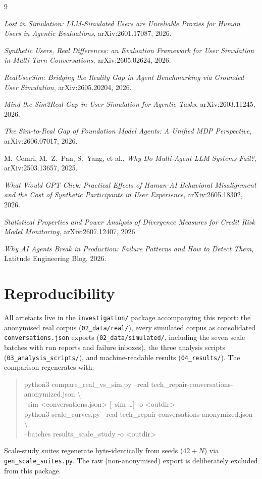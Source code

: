 \documentclass[11pt,a4paper]{article}
\begin{document}
\begin{thebibliography}{9}\small

 \emph{Lost in Simulation: LLM-Simulated Users are Unreliable Proxies for Human
Users in Agentic Evaluations}, arXiv:2601.17087, 2026.

 \emph{Synthetic Users, Real Differences: an Evaluation Framework for User
Simulation in Multi-Turn Conversations}, arXiv:2605.02624, 2026.

 \emph{RealUserSim: Bridging the Reality Gap in Agent Benchmarking via
Grounded User Simulation}, arXiv:2605.20204, 2026.

 \emph{Mind the Sim2Real Gap in User Simulation for Agentic Tasks},
arXiv:2603.11245, 2026.

 \emph{The Sim-to-Real Gap of Foundation Model Agents: A Unified MDP Perspective},
arXiv:2606.07017, 2026.

 M.~Cemri, M.~Z.~Pan, S.~Yang, et al., \emph{Why Do Multi-Agent LLM Systems Fail?},
arXiv:2503.13657, 2025.

 \emph{What Would GPT Click: Practical Effects of Human-AI Behavioral
Misalignment and the Cost of Synthetic Participants in User Experience}, arXiv:2605.18302, 2026.

 \emph{Statistical Properties and Power Analysis of Divergence Measures for
Credit Risk Model Monitoring}, arXiv:2607.12407, 2026.

 \emph{Why AI Agents Break in Production: Failure Patterns and How to Detect
Them}, Latitude Engineering Blog, 2026.

\end{thebibliography}

\appendix
\section{Reproducibility}
All artefacts live in the \texttt{investigation/} package accompanying this report:
the anonymised real corpus (\texttt{02\_data/real/}), every simulated corpus as consolidated
\texttt{conversations.json} exports (\texttt{02\_data/simulated/}, including the seven scale
batches with run reports and failure inboxes), the three analysis scripts
(\texttt{03\_analysis\_scripts/}), and machine-readable results
(\texttt{04\_results/}). The comparison regenerates with:
\begin{quote}\ttfamily\small
python3 compare\_real\_vs\_sim.py --real tech_repair-conversations-anonymized.json \textbackslash\\
\hspace*{1.5em} --sim <conversations.json> [--sim \ldots] -o <outdir>\\
python3 scale\_curves.py --real tech_repair-conversations-anonymized.json \textbackslash\\
\hspace*{1.5em} --batches results\_scale\_study -o <outdir>
\end{quote}
Scale-study suites regenerate byte-identically from seeds ($42{+}N$) via
\texttt{gen\_scale\_suites.py}. The raw (non-anonymised) export is deliberately excluded from
this package.
\end{document}
